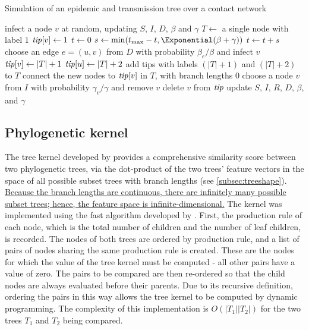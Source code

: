 \begin{algorithm}
  \label{alg:nettree}
  \caption{Simulation of an epidemic and transmission tree over a contact network}
  \begin{algorithmic}
    \State infect a node $v$ at random, updating $S$, $I$, $D$, $\beta$ and $\gamma$
    \State $T \gets$ a single node with label $1$
    \State $\mathit{tip}[v] \gets 1$
    \State $t \gets 0$
      \State $s \gets \min(t_{\max} - t, \Exponential(\beta + \gamma))$
      \EndFor
      \State $t \gets t + s$
          \State choose an edge $e = (u, v)$ from $D$ with probability $\beta_e / \beta$
                 and infect $v$
          \State $\mathit{tip}[v] \gets |T|+1$
          \State $\mathit{tip}[u] \gets |T|+2$
          \State add tips with labels $(|T|+1)$ and $(|T|+2)$ to $T$
          \State connect the new nodes to $\mathit{tip}[v]$ in $T$, with branch lengths $0$
        \Else
          \State choose a node $v$ from $I$ with probability $\gamma_v / \gamma$
                 and remove $v$
          \State delete $v$ from $\mathit{tip}$
        \EndIf
        \State update $S$, $I$, $R$, $D$, $\beta$, and $\gamma$
      \EndIf
    \EndWhile
  \end{algorithmic}
\end{algorithm}

\subsection{Phylogenetic kernel}

The tree kernel developed by \textcite{poon2013mapping} provides a
comprehensive similarity score between two phylogenetic trees, via the
dot-product of the two trees' feature vectors in the space of all possible
subset trees with branch lengths (see \cref{subsec:treeshape}). {\color{blue}
\uline{Because the branch lengths are continuous, there are infinitely many
possible subset trees; hence, the feature space is infinite-dimensional.}}
The kernel was implemented using the fast algorithm developed by
\textcite{moschitti2006making}. First, the production rule of each node, which
is the total number of children and the number of leaf children, is recorded.
The nodes of both trees are ordered by production rule, and a list of pairs of
nodes sharing the same production rule is created. These are the nodes for
which the value of the tree kernel must be computed - all other pairs have a
value of zero. The pairs to be compared are then re-ordered so that the child
nodes are always evaluated before their parents. Due to its recursive
definition, ordering the pairs in this way allows the tree kernel to be
computed by dynamic programming. The complexity of this implementation is
$O(|T_1||T_2|)$ for the two trees $T_1$ and $T_2$ being compared.

